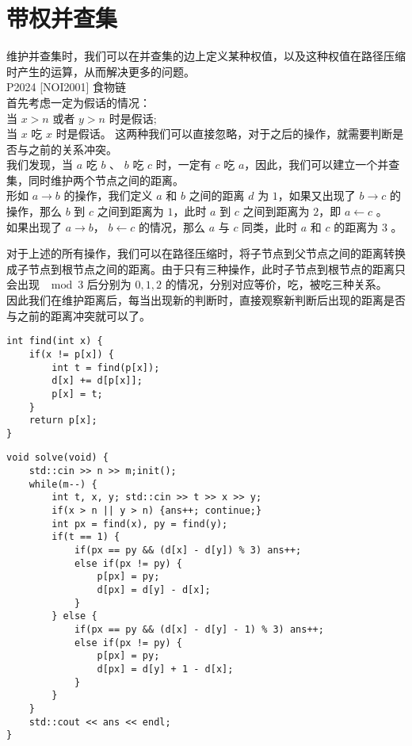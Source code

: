 \documentclass{beamer}
\begin{document}
\section{带权并查集}
\begin{frame}
维护并查集时，我们可以在并查集的边上定义某种权值，以及这种权值在路径压缩时产生的运算，从而解决更多的问题。\\ 
P2024 [NOI2001] 食物链\\
首先考虑一定为假话的情况：\\
当 $x > n$ 或者 $y > n$ 时是假话; \\ 
当 $x$ 吃 $x$ 时是假话。
这两种我们可以直接忽略，对于之后的操作，就需要判断是否与之前的关系冲突。\\ 
我们发现，当 $a$ 吃 $b$ 、 $b$ 吃 $c$ 时，一定有 $c$ 吃 $a$，因此，我们可以建立一个并查集，同时维护两个节点之间的距离。 \\ 
形如 $a \rightarrow b$ 的操作，我们定义 $a$ 和 $b$ 之间的距离 $d$ 为 $1$，如果又出现了 $b \rightarrow c$ 的操作，那么 $b$ 到 $c$ 之间到距离为 $1$，此时 $a$ 到 $c$ 之间到距离为 $2$，即 $a \leftarrow c$ 。\\ 
如果出现了 $a \rightarrow b$， $b \leftarrow c$ 的情况，那么 $a$ 与 $c$ 同类，此时 $a$ 和 $c$ 的距离为 $3$ 。
\end{frame}
\begin{frame}
对于上述的所有操作，我们可以在路径压缩时，将子节点到父节点之间的距离转换成子节点到根节点之间的距离。由于只有三种操作，此时子节点到根节点的距离只会出现 $\mod 3$ 后分别为 $0, 1, 2$ 的情况，分别对应等价，吃，被吃三种关系。\\ 
因此我们在维护距离后，每当出现新的判断时，直接观察新判断后出现的距离是否与之前的距离冲突就可以了。
\end{frame}
\begin{frame}[fragile]
\begin{onlyenv}
\begin{verbatim}
int find(int x) {
    if(x != p[x]) {
        int t = find(p[x]);
        d[x] += d[p[x]];
        p[x] = t;
    }
    return p[x];
}
\end{verbatim}
\end{onlyenv}
\end{frame}
\begin{frame}[fragile]
\begin{onlyenv}
\begin{verbatim}
void solve(void) {
    std::cin >> n >> m;init();
    while(m--) {
        int t, x, y; std::cin >> t >> x >> y;
        if(x > n || y > n) {ans++; continue;}
        int px = find(x), py = find(y);
        if(t == 1) {
            if(px == py && (d[x] - d[y]) % 3) ans++;
            else if(px != py) {
                p[px] = py;
                d[px] = d[y] - d[x];
            }
        } else {
            if(px == py && (d[x] - d[y] - 1) % 3) ans++;
            else if(px != py) {
                p[px] = py;
                d[px] = d[y] + 1 - d[x];
            }
        }
    }
    std::cout << ans << endl;
}
\end{verbatim}
\end{onlyenv}
\end{frame}
\end{document}
